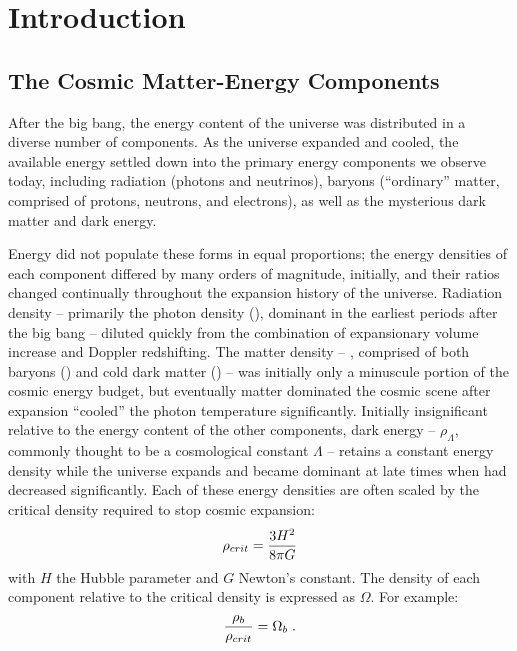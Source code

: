 
\chapter{Introduction}
\label{chap:Intro}
\section{The Cosmic Matter-Energy Components}
\label{sec:Intro.Components}
After the big bang, the energy content of the universe was distributed
in a diverse number of components. As the universe expanded and
cooled, the available energy settled down into the primary energy
components we observe today, including radiation (photons and
neutrinos), baryons (``ordinary'' matter, comprised of protons,
neutrons, and electrons), as well as the mysterious dark matter and
dark energy.

Energy did not populate these forms in equal proportions; the energy
densities of each component differed by many orders of magnitude,
initially, and their ratios changed continually throughout the
expansion history of the universe. Radiation density -- primarily the
photon density (\rhog), dominant in the earliest periods after the big
bang -- diluted quickly from the combination of expansionary volume
increase and Doppler redshifting. The matter density -- \rhom,
comprised of both baryons (\rhob) and cold dark matter (\rhoc) -- was
initially only a minuscule portion of the cosmic energy budget, but
eventually matter dominated the cosmic scene after expansion
``cooled'' the photon temperature significantly. Initially
insignificant relative to the energy content of the other components,
dark energy -- $\rho_\Lambda$, commonly thought to be a cosmological
constant $\Lambda$ -- retains a constant energy density while the
universe expands and became dominant at late times when \rhom{} had
decreased significantly. Each of these energy densities are often
scaled by the critical density required to stop cosmic expansion:
\begin{equation}
\rho_{crit} = \frac{3H^2}{8\pi{}G} \nonumber
\end{equation}
with $H$ the Hubble parameter and $G$ Newton's constant. The density of each component relative to the critical
density is expressed as $\Omega$. For example:
\begin{equation}
\frac{\rho_b}{\rho_{crit}} = \Omega_b\;.  \nonumber
\end{equation}


